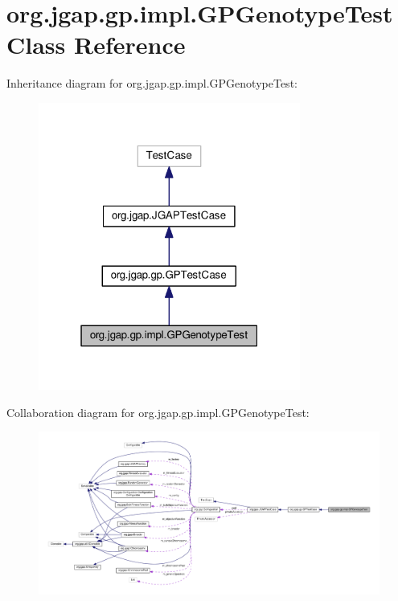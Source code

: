 \hypertarget{classorg_1_1jgap_1_1gp_1_1impl_1_1_g_p_genotype_test}{\section{org.\-jgap.\-gp.\-impl.\-G\-P\-Genotype\-Test Class Reference}
\label{classorg_1_1jgap_1_1gp_1_1impl_1_1_g_p_genotype_test}
}


Inheritance diagram for org.\-jgap.\-gp.\-impl.\-G\-P\-Genotype\-Test\-:
\nopagebreak
\begin{figure}[H]
\begin{center}
\leavevmode
\includegraphics[width=244pt]{classorg_1_1jgap_1_1gp_1_1impl_1_1_g_p_genotype_test__inherit__graph}
\end{center}
\end{figure}


Collaboration diagram for org.\-jgap.\-gp.\-impl.\-G\-P\-Genotype\-Test\-:
\nopagebreak
\begin{figure}[H]
\begin{center}
\leavevmode
\includegraphics[width=350pt]{classorg_1_1jgap_1_1gp_1_1impl_1_1_g_p_genotype_test__coll__graph}
\end{center}
\end{figure}
